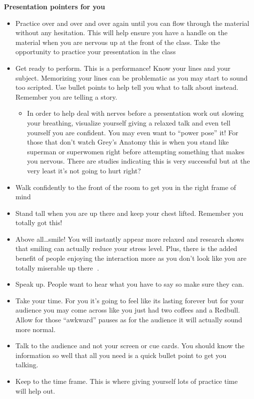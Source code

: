 \documentclass[
]{book}
\providecommand{\tightlist}{%
  \setlength{\itemsep}{0pt}\setlength{\parskip}{0pt}}
\begin{document}
\textbf{Presentation pointers for you}

\begin{itemize}
\tightlist
\item
  Practice over and over and over again until you can flow through the material without any hesitation. This will help ensure you have a handle on the material when you are nervous up at the front of the class. Take the opportunity to practice your presentation in the class
\item
  Get ready to perform. This is a performance! Know your lines and your subject. Memorizing your lines can be problematic as you may start to sound too scripted. Use bullet points to help tell you what to talk about instead. Remember you are telling a story.

  \begin{itemize}
  \tightlist
  \item
    In order to help deal with nerves before a presentation work out slowing your breathing, visualize yourself giving a relaxed talk and even tell yourself you are confident. You may even want to ``power pose'' it! For those that don't watch Grey's Anatomy this is when you stand like superman or superwomen right before attempting something that makes you nervous. There are studies indicating this is very successful but at the very least it's not going to hurt right?
  \end{itemize}
\item
  Walk confidently to the front of the room to get you in the right frame of mind
\item
  Stand tall when you are up there and keep your chest lifted. Remember you totally got this!
\item
  Above all\ldots smile! You will instantly appear more relaxed and research shows that smiling can actually reduce your stress level. Plus, there is the added benefit of people enjoying the interaction more as you don't look like you are totally miserable up there .
\item
  Speak up. People want to hear what you have to say so make sure they can.
\item
  Take your time. For you it's going to feel like its lasting forever but for your audience you may come across like you just had two coffees and a Redbull. Allow for those ``awkward'' pauses as for the audience it will actually sound more normal.
\item
  Talk to the audience and not your screen or cue cards. You should know the information so well that all you need is a quick bullet point to get you talking.
\item
  Keep to the time frame. This is where giving yourself lots of practice time will help out.
\end{itemize}
\end{document}

